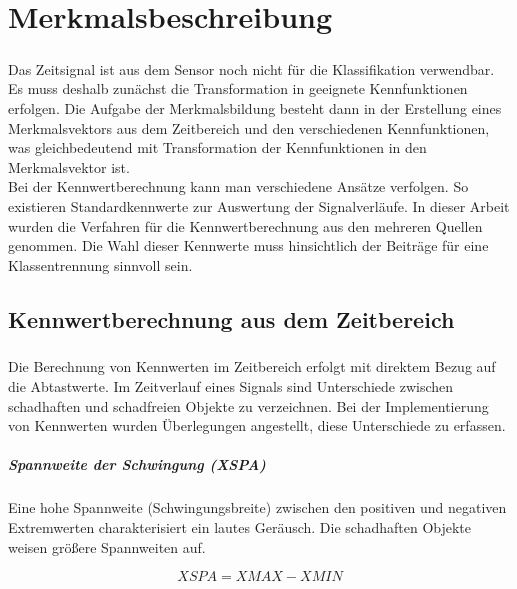 \chapter{Merkmalsbeschreibung}

\paragraph{}
Das Zeitsignal ist aus dem Sensor noch nicht f\"ur die Klassifikation verwendbar. Es muss deshalb zun\"achst die Transformation in geeignete Kennfunktionen erfolgen. Die Aufgabe der Merkmalsbildung besteht dann in der Erstellung eines Merkmalsvektors aus dem Zeitbereich und den verschiedenen Kennfunktionen, was gleichbedeutend mit Transformation der Kennfunktionen in den Merkmalsvektor ist.\\
Bei der Kennwertberechnung kann man verschiedene Ans\"atze verfolgen. So existieren Standardkennwerte zur Auswertung der Signalverl\"aufe. In dieser Arbeit wurden die Verfahren f\"ur die Kennwertberechnung aus den mehreren Quellen genommen. Die Wahl dieser Kennwerte muss hinsichtlich der Beitr\"age f\"ur eine Klassentrennung sinnvoll sein.

\section{Kennwertberechnung aus dem Zeitbereich}

\paragraph{}
Die Berechnung von Kennwerten im Zeitbereich erfolgt mit direktem Bezug auf die Abtastwerte. Im Zeitverlauf eines Signals sind Unterschiede zwischen schadhaften und schadfreien Objekte zu verzeichnen. Bei der Implementierung von Kennwerten wurden \"Uberlegungen angestellt, diese Unterschiede zu erfassen.

\paragraph{Spannweite der Schwingung (XSPA)\\}
Eine hohe Spannweite (Schwingungsbreite) zwischen den positiven und negativen Extremwerten charakterisiert ein lautes Ger\"ausch. Die schadhaften Objekte weisen gr\"o\ss{}ere Spannweiten auf.

\begin{equation}
\mathit{XSPA}=\mathit{XMAX}-\mathit{XMIN}
\end{equation}

